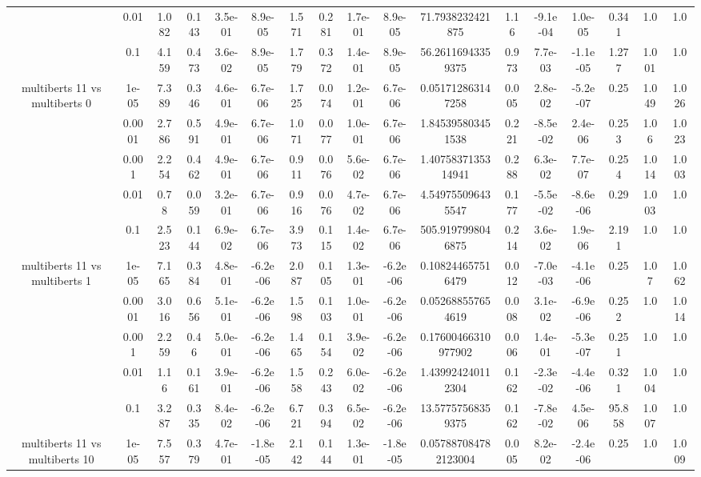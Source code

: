 \begin{tabular}{|c|c|c|c|c|c|c|c|c|c|c|c|c|c|c|c|c|}
 & 0.01 & 1.082 & 0.143 & 3.5e-01 & 8.9e-05 & 1.571 & 0.281 & 1.7e-01 & 8.9e-05 & 71.7938232421875 & 1.16 & -9.1e-04 & 1.0e-05 & 0.341 & 1.0 & 1.0 \\
 & 0.1 & 4.159 & 0.473 & 3.6e-02 & 8.9e-05 & 1.779 & 0.372 & 1.4e-01 & 8.9e-05 & 56.26116943359375 & 0.973 & 7.7e-03 & -1.1e-05 & 1.277 & 1.001 & 1.0 \\
\hline
\multirow{5}{*}{multiberts 11 vs multiberts 0} & 1e-05 & 7.389 & 0.346 & 4.6e-01 & 6.7e-06 & 1.725 & 0.074 & 1.2e-01 & 6.7e-06 & 0.051712863147258 & 0.005 & 2.8e-02 & -5.2e-07 & 0.25 & 1.049 & 1.026 \\
 & 0.0001 & 2.786 & 0.591 & 4.9e-01 & 6.7e-06 & 1.071 & 0.077 & 1.0e-01 & 6.7e-06 & 1.845395803451538 & 0.221 & -8.5e-02 & 2.4e-06 & 0.253 & 1.06 & 1.023 \\
 & 0.001 & 2.254 & 0.462 & 4.9e-01 & 6.7e-06 & 0.911 & 0.076 & 5.6e-02 & 6.7e-06 & 1.4075837135314941 & 0.288 & 6.3e-02 & 7.7e-07 & 0.254 & 1.014 & 1.003 \\
 & 0.01 & 0.78 & 0.059 & 3.2e-01 & 6.7e-06 & 0.916 & 0.076 & 4.7e-02 & 6.7e-06 & 4.549755096435547 & 0.177 & -5.5e-02 & -8.6e-06 & 0.29 & 1.003 & 1.0 \\
 & 0.1 & 2.523 & 0.144 & 6.9e-02 & 6.7e-06 & 3.973 & 0.115 & 1.4e-02 & 6.7e-06 & 505.9197998046875 & 0.214 & 3.6e-02 & 1.9e-06 & 2.191 & 1.0 & 1.0 \\
\hline
\multirow{5}{*}{multiberts 11 vs multiberts 1} & 1e-05 & 7.165 & 0.384 & 4.8e-01 & -6.2e-06 & 2.087 & 0.105 & 1.3e-01 & -6.2e-06 & 0.108244657516479 & 0.012 & -7.0e-03 & -4.1e-06 & 0.25 & 1.07 & 1.062 \\
 & 0.0001 & 3.016 & 0.656 & 5.1e-01 & -6.2e-06 & 1.598 & 0.103 & 1.0e-01 & -6.2e-06 & 0.052688557654619 & 0.008 & 3.1e-02 & -6.9e-06 & 0.252 & 1.0 & 1.014 \\
 & 0.001 & 2.259 & 0.46 & 5.0e-01 & -6.2e-06 & 1.465 & 0.154 & 3.9e-02 & -6.2e-06 & 0.17600466310977902 & 0.006 & 1.4e-01 & -5.3e-07 & 0.251 & 1.0 & 1.0 \\
 & 0.01 & 1.16 & 0.161 & 3.9e-01 & -6.2e-06 & 1.558 & 0.243 & 6.0e-02 & -6.2e-06 & 1.439924240112304 & 0.162 & -2.3e-02 & -4.4e-06 & 0.321 & 1.004 & 1.0 \\
 & 0.1 & 3.287 & 0.335 & 8.4e-02 & -6.2e-06 & 6.721 & 0.394 & 6.5e-02 & -6.2e-06 & 13.57757568359375 & 0.162 & -7.8e-02 & 4.5e-06 & 95.858 & 1.007 & 1.0 \\
\hline
\multirow{5}{*}{multiberts 11 vs multiberts 10} & 1e-05 & 7.557 & 0.379 & 4.7e-01 & -1.8e-05 & 2.142 & 0.144 & 1.3e-01 & -1.8e-05 & 0.057887084782123004 & 0.005 & 8.2e-02 & -2.4e-06 & 0.25 & 1.0 & 1.009 \\

\end{tabular}
